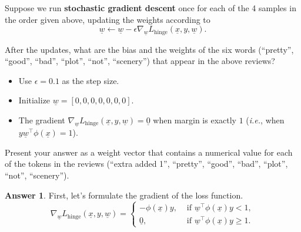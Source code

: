 \documentclass{article}
\renewcommand{\vec}[1]{\underline{#1}}
\theoremstyle{definition}
\newtheorem*{answer}{Answer}
\begin{document}
\begin{question}[start=0]
		Suppose we run \textbf{stochastic gradient descent} once for each of the 4 samples in the order given above, updating the weights according to
		\begin{equation*}
			\underline{w} \leftarrow \underline{w} - \epsilon \nabla_{\underline{w}} L_{\text{hinge}}(\underline{x}, y, \underline{w}).
		\end{equation*}
		
		After the updates, what are the bias and the weights of the six words (``pretty'', ``good'', ``bad'', ``plot'', ``not'', ``scenery'') that appear in the above reviews?
		\begin{itemize}
			\item Use $\epsilon=0.1$ as the step size.
			\item Initialize $\underline{w}=[0,0,0,0,0,0,0]$.
			\item The gradient $\nabla_{\underline{w}} L_{\text{hinge}}(\underline{x}, y, \underline{w})=\underline{0}$ when margin is exactly $1$ (\emph{i.e.}, when $y\underline{w}^\top\phi(\underline{x}) = 1$).
		\end{itemize}
		
		Present your answer as a weight vector that contains a numerical value for each of the tokens in the reviews  (``extra added 1'', ``pretty'', ``good'', ``bad'', ``plot'', ``not'', ``scenery'').
		\begin{answer}
			First, let's formulate the gradient of the loss function.
			\begin{equation*}
				\nabla_{\underline{w}} L_{\text{hinge}}(\underline{x}, y, \underline{w}) = \begin{cases}
						-\phi(\underline{x})y, & \text{ if } \underline{w}^\top\phi(\underline{x})y < 1,\\
						\vec{0}, & \text{ if } \underline{w}^\top\phi(\underline{x})y \geq 1.
					\end{cases}
				\end{equation*}
			

\end{answer}
\end{question}
\end{document}
